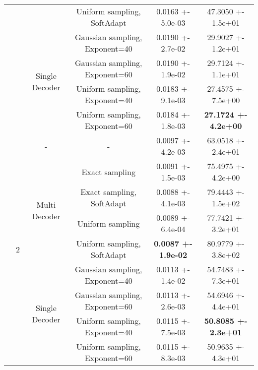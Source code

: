 \begin{tabular}{||c|c|c|c|c|c||}
\cline{4-6}
 &  &  & Uniform sampling, SoftAdapt & 0.0163 +- 5.0e-03 & 47.3050 +- 1.5e+01 \\
\cline{4-6}
\cline{3-6}
 &  & \multirow{4}{*}{Single Decoder} & Gaussian sampling, Exponent=40 & 0.0190 +- 2.7e-02 & 29.9027 +- 1.2e+01 \\
\cline{4-6}
 &  &  & Gaussian sampling, Exponent=60 & 0.0190 +- 1.9e-02 & 29.7124 +- 1.1e+01 \\
\cline{4-6}
 &  &  & Uniform sampling, Exponent=40 & 0.0183 +- 9.1e-03 & 27.4575 +- 7.5e+00 \\
\cline{4-6}
 &  &  & Uniform sampling, Exponent=60 & 0.0184 +- 1.8e-03 & \textbf{27.1724 +- 4.2e+00} \\
\cline{4-6}
\cline{3-6}
\cline{2-6}
 & \multirow{9}{*}{2} & \multirow{1}{*}{-} & - & 0.0097 +- 4.2e-03 & 63.0518 +- 2.4e+01 \\
\cline{4-6}
\cline{3-6}
 &  & \multirow{4}{*}{Multi Decoder} & Exact sampling & 0.0091 +- 1.5e-03 & 75.4975 +- 4.2e+00 \\
\cline{4-6}
 &  &  & Exact sampling, SoftAdapt & 0.0088 +- 4.1e-03 & 79.4443 +- 1.5e+02 \\
\cline{4-6}
 &  &  & Uniform sampling & 0.0089 +- 6.4e-04 & 77.7421 +- 3.2e+01 \\
\cline{4-6}
 &  &  & Uniform sampling, SoftAdapt & \textbf{0.0087 +- 1.9e-02} & 80.9779 +- 3.8e+02 \\
\cline{4-6}
\cline{3-6}
 &  & \multirow{4}{*}{Single Decoder} & Gaussian sampling, Exponent=40 & 0.0113 +- 1.4e-02 & 54.7483 +- 7.3e+01 \\
\cline{4-6}
 &  &  & Gaussian sampling, Exponent=60 & 0.0113 +- 2.6e-03 & 54.6946 +- 4.4e+01 \\
\cline{4-6}
 &  &  & Uniform sampling, Exponent=40 & 0.0115 +- 7.5e-03 & \textbf{50.8085 +- 2.3e+01} \\
\cline{4-6}
 &  &  & Uniform sampling, Exponent=60 & 0.0115 +- 8.3e-03 & 50.9635 +- 4.3e+01 \\
\cline{4-6}
\cline{3-6}
\cline{2-6}
\hline
\hline
\end{tabular}

